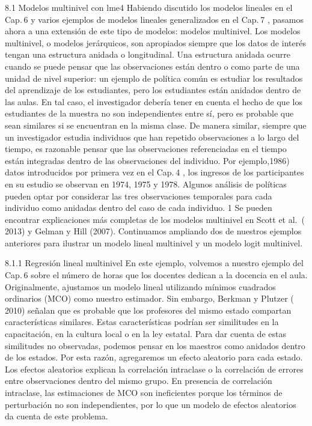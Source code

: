\documentclass[
]{book}
\begin{document}
8.1 Modelos multinivel con lme4
Habiendo discutido los modelos lineales en el Cap. 6 y varios ejemplos de modelos lineales generalizados en el Cap. 7 , pasamos ahora a una extensión de este tipo de modelos: modelos multinivel. Los modelos multinivel, o modelos jerárquicos, son apropiados siempre que los datos de interés tengan una estructura anidada o longitudinal. Una estructura anidada ocurre cuando se puede pensar que las observaciones están dentro o como parte de una unidad de nivel superior: un ejemplo de política común es estudiar los resultados del aprendizaje de los estudiantes, pero los estudiantes están anidados dentro de las aulas. En tal caso, el investigador debería tener en cuenta el hecho de que los estudiantes de la muestra no son independientes entre sí, pero es probable que sean similares si se encuentran en la misma clase. De manera similar, siempre que un investigador estudia individuos que han repetido observaciones a lo largo del tiempo, es razonable pensar que las observaciones referenciadas en el tiempo están integradas dentro de las observaciones del individuo. Por ejemplo,1986) datos introducidos por primera vez en el Cap. 4 , los ingresos de los participantes en su estudio se observan en 1974, 1975 y 1978. Algunos análisis de políticas pueden optar por considerar las tres observaciones temporales para cada individuo como anidadas dentro del caso de cada individuo. 1 Se pueden encontrar explicaciones más completas de los modelos multinivel en Scott et al.~( 2013) y Gelman y Hill (2007). Continuamos ampliando dos de nuestros ejemplos anteriores para ilustrar un modelo lineal multinivel y un modelo logit multinivel.

8.1.1 Regresión lineal multinivel
En este ejemplo, volvemos a nuestro ejemplo del Cap. 6 sobre el número de horas que los docentes dedican a la docencia en el aula. Originalmente, ajustamos un modelo lineal utilizando mínimos cuadrados ordinarios (MCO) como nuestro estimador. Sin embargo, Berkman y Plutzer ( 2010) señalan que es probable que los profesores del mismo estado compartan características similares. Estas características podrían ser similitudes en la capacitación, en la cultura local o en la ley estatal. Para dar cuenta de estas similitudes no observadas, podemos pensar en los maestros como anidados dentro de los estados. Por esta razón, agregaremos un efecto aleatorio para cada estado. Los efectos aleatorios explican la correlación intraclase o la correlación de errores entre observaciones dentro del mismo grupo. En presencia de correlación intraclase, las estimaciones de MCO son ineficientes porque los términos de perturbación no son independientes, por lo que un modelo de efectos aleatorios da cuenta de este problema.
\end{document}
